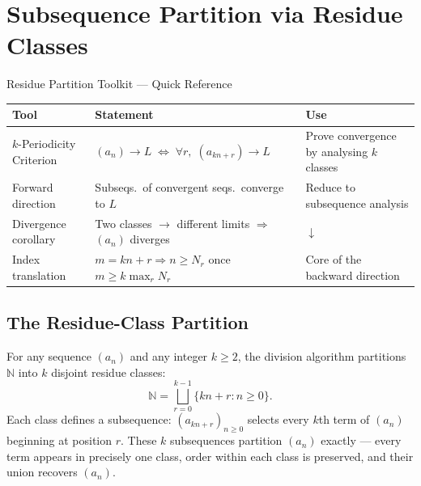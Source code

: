 
\section{Subsequence Partition via Residue Classes}
\label{sec:residue-partition}

\begin{toolkitbox}{Residue Partition Toolkit --- Quick Reference}
\small
\begin{tabular}{l l l}
\toprule
\textbf{Tool} & \textbf{Statement} & \textbf{Use} \\
\midrule
$k$-Periodicity Criterion
  & $(a_n)\to L \;\Leftrightarrow\; \forall r,\;(a_{kn+r})\to L$
  & Prove convergence by analysing $k$ classes \\[3pt]
Forward direction
  & Subseqs.\ of convergent seqs.\ converge to $L$
  & Reduce to subsequence analysis \\[3pt]
Divergence corollary
  & Two classes $\to$ different limits $\Rightarrow$ $(a_n)$ diverges
  & \hyperref[prop:residue-divergence]{$\downarrow$} \\[3pt]
Index translation
  & $m = kn+r \Rightarrow n \geq N_r$ once $m \geq k\max_r N_r$
  & Core of the backward direction \\
\bottomrule
\end{tabular}
\end{toolkitbox}

\subsection*{The Residue-Class Partition}
\label{subsec:residue-partition-def}

For any sequence $(a_n)$ and any integer $k \geq 2$, the division algorithm
partitions $\mathbb{N}$ into $k$ disjoint residue classes:
\[
  \mathbb{N} = \bigsqcup_{r=0}^{k-1} \{kn + r : n \geq 0\}.
\]
Each class defines a subsequence: $(a_{kn+r})_{n \geq 0}$ selects every
$k$th term of $(a_n)$ beginning at position $r$. These $k$ subsequences
partition $(a_n)$ exactly — every term appears in precisely one class,
order within each class is preserved, and their union recovers $(a_n)$.

